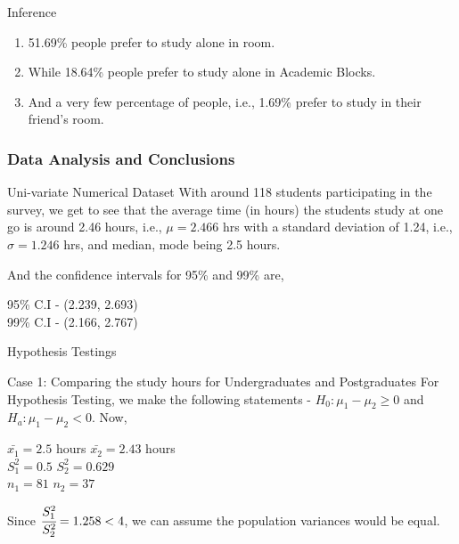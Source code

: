 \documentclass{beamer}
\begin{document}
\begin{frame}
\begin{block}{Inference}
\begin{enumerate}
\item 51.69\% people prefer to study alone in room.
\item While 18.64\% people prefer to study alone in Academic Blocks.
\item And a very few percentage of people, i.e., 1.69\% prefer to study in their friend's room.
\end{enumerate}
\end{block}
\end{frame}

\begin{frame}
\frametitle{Data Analysis and Conclusions}
\begin{block}{Uni-variate Numerical Dataset}
With around 118 students participating in the survey, we get to see that the average time (in hours) the students study at one go is around 2.46 hours, i.e., $\mu = 2.466$ hrs with a standard deviation of 1.24, i.e., $\sigma = 1.246$ hrs, and median, mode being 2.5 hours.\par
And the confidence intervals for 95\% and 99\% are,
\begin{center}
    95\% C.I - (2.239, 2.693) \\
    99\% C.I - (2.166, 2.767)
\end{center}
\end{block}
\end{frame}

\begin{frame}{Hypothesis Testings}
\begin{block}{Case 1: Comparing the study hours for Undergraduates and Postgraduates}
For Hypothesis Testing, we make the following statements - 
$ H_0 : \mu_1 - \mu_2 \geq 0$ and $H_a : \mu_1 - \mu_2 < 0$. Now, 
\par
\begin{center}
    $\bar{x_1} = 2.5$ hours \quad $\bar{x_2} = 2.43$ hours \\
    $S^2_1 = 0.5$ \quad
    $S^2_2 = 0.629$ \\
    $n_1 = 81$ \quad
    $n_2 = 37$
\end{center}

Since $\cfrac{S_1^2}{S_2^2} = 1.258 < 4$, we can assume the population variances would be equal.
\end{block}
\end{frame}
\end{document}
